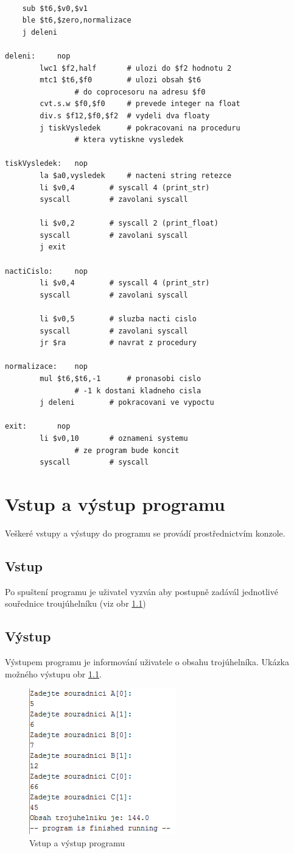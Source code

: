 \begin{lstlisting}
  	
  	sub $t6,$v0,$v1
  	ble $t6,$zero,normalizace
  	j deleni

deleni:		nop
		lwc1 $f2,half		# ulozi do $f2 hodnotu 2
		mtc1 $t6,$f0		# ulozi obsah $t6
				# do coprocesoru na adresu $f0
		cvt.s.w $f0,$f0		# prevede integer na float
  		div.s $f12,$f0,$f2	# vydeli dva floaty
  		j tiskVysledek		# pokracovani na proceduru
				# ktera vytiskne vysledek
  		
tiskVysledek:	nop
		la $a0,vysledek		# nacteni string retezce
		li $v0,4		# syscall 4 (print_str)
		syscall			# zavolani syscall

		li $v0,2		# syscall 2 (print_float)
		syscall			# zavolani syscall
		j exit
 
nactiCislo: 	nop
		li $v0,4		# syscall 4 (print_str)
		syscall			# zavolani syscall
		
		li $v0,5		# sluzba nacti cislo
		syscall			# zavolani syscall
		jr $ra			# navrat z procedury
		
normalizace: 	nop			
		mul $t6,$t6,-1		# pronasobi cislo
				# -1 k dostani kladneho cisla
		j deleni		# pokracovani ve vypoctu

exit: 		nop
		li $v0,10		# oznameni systemu
				# ze program bude koncit
		syscall			# syscall

\end{lstlisting}

\chapter{Vstup a výstup programu}
Veškeré vstupy a výstupy do programu se provádí prostřednictvím konzole.
\section{Vstup}
Po spuštení programu je uživatel vyzván aby postupně zadávál jednotlivé souřednice troujúhelníku (viz obr \ref{fig:klient01})

\section{Výstup}

Výstupem programu je informování uživatele o obsahu trojúhelníka. Ukázka možného výstupu obr \ref{fig:klient01}.

\begin{figure}[h]
	\centering
	
		\includegraphics[scale=1]{45.PNG}
		\caption{Vstup a výstup programu}
		\label{fig:klient01}
	\end{figure} 
	
